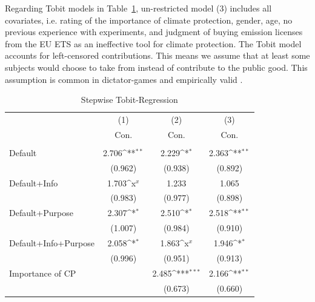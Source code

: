 \documentclass[review, authoryear,12pt]{elsarticle}
\begin{document}
Regarding Tobit models in Table~\ref{tab4}, un-restricted model (3) includes all covariates, i.e. rating of the importance of climate protection, gender, age, no previous experience with experiments, and judgment of buying emission licenses from the EU ETS as an ineffective tool for climate protection. The Tobit model accounts for left-censored contributions. This means we assume that at least some subjects would choose to take from instead of contribute to the public good. This assumption is common in dictator-games and empirically valid \citep{Engel.2011}.

\begin{table}[htbp]\centering
\begin{adjustbox}{max width=\textwidth}
\def\sym#1{\ifmmode^{#1}\else\(^{#1}\)\fi}
\caption{Stepwise Tobit-Regression\label{tab4}}
\begin{tabular}{l*{3}{c}}
\hline\hline
                    &\multicolumn{1}{c}{(1)}&\multicolumn{1}{c}{(2)}&\multicolumn{1}{c}{(3)}\\
                    &\multicolumn{1}{c}{Con.}&\multicolumn{1}{c}{Con.}&\multicolumn{1}{c}{Con.}\\
\hline
               &                     &                     &                     \\
Default             &       2.706\sym{**} &       2.229\sym{*}  &       2.363\sym{**} \\
                    &     (0.962)         &     (0.938)         &     (0.892)         \\
Default+Info        &       1.703\sym{x}  &       1.233         &       1.065         \\
                    &     (0.983)         &     (0.977)         &     (0.898)         \\
Default+Purpose     &       2.307\sym{*}  &       2.510\sym{*}  &       2.518\sym{**} \\
                    &     (1.007)         &     (0.984)         &     (0.910)         \\
Default+Info+Purpose&       2.058\sym{*}  &       1.863\sym{x}  &       1.946\sym{*}  \\
                    &     (0.996)         &     (0.951)         &     (0.913)         \\
Importance of CP       &                     &       2.485\sym{***}&       2.166\sym{**} \\
                    &                     &     (0.673)         &     (0.660)         \\

\end{tabular}
\end{adjustbox}
\end{table}
\end{document}
